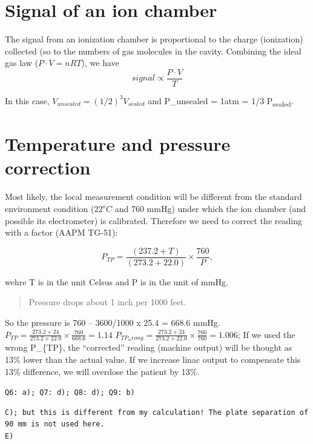 \documentclass[]{book}
\theoremstyle{definition}
\theoremstyle{definition}
\theoremstyle{definition}
\theoremstyle{remark}
\begin{document}
\section{Signal of an ion chamber}\label{signal-of-an-ion-chamber}

The signal from an ionization chamber is proportional to the charge
(ionization) collected (so to the numbers of gas molecules in the
cavity. Combining the ideal gas law (\(P \cdot V = nRT\)), we have
\[signal \propto \frac{P \cdot V}{T} \]

In this case, \(V_{unsealed}=(1/2)^3 V_{sealed}\) and P\_unsealed = 1atm
= 1/3 P\textsubscript{sealed}.

\section{Temperature and pressure
correction}\label{temperature-and-pressure-correction}

Most likely, the local measurement condition will be different from the
standard environment condition (\(22^{o}C\) and 760 mmHg) under which
the ion chamber (and possible its electrometer) is calibrated. Therefore
we need to correct the reading with a factor (AAPM TG-51):

\begin{equation}
  P_{TP}=\frac{(237.2+T)}{(273.2+22.0)}\times\frac{760}{P},
  \label{eq:ptp}
\end{equation}

wehre T is in the unit Celsus and P is in the unit of mmHg.

\begin{quote}
Pressure drops about 1 inch per 1000 feet.
\end{quote}

So the pressure is 760 -- 3600/1000 x 25.4 = 668.6 mmHg.
\(P_{TP}=\frac{273.2+24}{273.2+22.0} \times \frac{760}{668.6}=1.14\)
\(P_{TP_wrong}=\frac{273.2+24}{273.2+22.0} \times \frac{760}{760}=1.006\);
If we used the wrong P\_\{TP\}, the ``corrected'' reading (machine
output) will be thought as 13\% lower than the actual value. If we
increase linac output to compensate this 13\% difference, we will
overdose the patient by 13\%.

\texttt{Q6:\ a);\ Q7:\ d);\ Q8:\ d);\ Q9:\ b)}

\begin{verbatim}
C); but this is different from my calculation! The plate separation of 90 mm is not used here.
E)
\end{verbatim}
\end{document}
